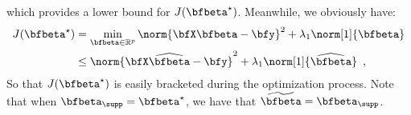 which provides a lower bound for $J(\bfbeta^\star)$.
Meanwhile, we obviously have:
\begin{align*}
J(\bfbeta^\star) & = \min_{\bfbeta\in\mathbb{R}^p} 
  \norm{\bfX \bfbeta - \bfy}^2 + \lambda_1 \norm[1]{\bfbeta} \\
  &\leq \norm{\bfX \widehat\bfbeta - \bfy}^2 + \lambda_1  \norm[1]{\widehat\bfbeta} 
  \enspace,
\end{align*}
So that $J(\bfbeta^\star)$ is easily bracketed during the optimization process. 
Note that when $\bfbeta_\supp=\bfbeta^\star$, we have that
$\widetilde{\bfbeta}=\bfbeta_\supp$.
\fi

% 

